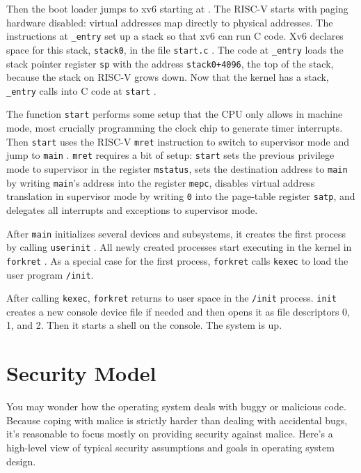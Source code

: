 Then the boot loader jumps to xv6 starting at
.
The RISC-V starts with paging hardware disabled:
virtual addresses map directly to physical addresses.
The instructions at
\lstinline{_entry}
set up a stack so that xv6 can run C code.
Xv6 declares space for this stack,
\lstinline{stack0},
in the file
\lstinline{start.c}
.
The code at
\lstinline{_entry}
loads the stack pointer register
\texttt{sp}
with the address
\lstinline{stack0+4096},
the top of the stack, because the stack
on RISC-V grows down.
Now that the kernel has a stack,
\lstinline{_entry}
calls into C code at
\lstinline{start}
.

The function
\lstinline{start}
performs some setup that the CPU only allows in machine mode,
most crucially programming the clock chip to generate
timer interrupts.
Then {\tt start} uses the RISC-V {\tt mret}
instruction to switch to supervisor mode and
jump to 
\lstinline{main}
.
{\tt mret} requires
a bit of setup:
{\tt start} sets the previous privilege mode to
supervisor in the register
\lstinline{mstatus},
sets the destination address to
\lstinline{main}
by writing
\lstinline{main}'s
address into
the register
\lstinline{mepc},
disables virtual address translation in supervisor mode
by writing
\lstinline{0}
into the page-table register
\lstinline{satp},
and delegates all interrupts and exceptions
to supervisor mode.

After
\lstinline{main}
initializes several devices and subsystems, 
it creates the first process by calling 
\lstinline{userinit}
.
All newly created processes start executing in the kernel in
\lstinline{forkret}
.
As a special case for the first process, {\tt forkret}
calls {\tt kexec} to load the user program {\tt /init}.

After calling
\lstinline{kexec},
{\tt forkret} returns to user space in
the \lstinline{/init} process.
\lstinline{init}
creates a new console device file
if needed
and then opens it as file descriptors 0, 1, and 2.
Then it starts a shell on the console.
The system is up.

\section{Security Model}

You may wonder how the operating system deals with buggy or malicious
code. Because coping with malice is strictly harder than dealing with
accidental bugs, it's reasonable to 
focus mostly on providing security against malice.
Here's a high-level view of typical security assumptions and
goals in operating system design.

